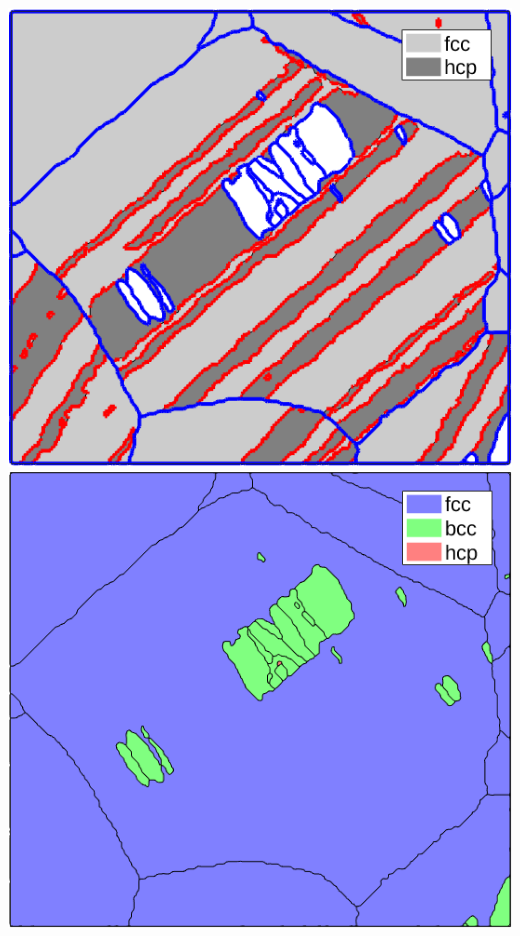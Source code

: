 \documentclass[compress]{beamer}
\begin{document}
\begin{frame}[fragile]
\begin{columns}
\begin{column}{0.35\textwidth}
{        \includegraphics[width=\textwidth]{pic/grainMerged}\\
        \includegraphics[width=\textwidth]{pic/grainMergedb}}
    \end{column}
  \end{columns}
\end{frame}
\end{document}
